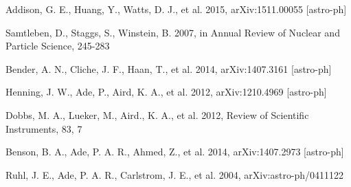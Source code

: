 \documentclass[preprint]{aastex}
\begin{document}
%
\begin{thebibliography}{dummy}
Addison, G. E., Huang, Y., Watts, D. J., et al. 2015, {arXiv:1511.00055 [astro-ph]}

Samtleben, D., Staggs, S., Winstein, B. 2007, in Annual Review of Nuclear and Particle Science, 245-283

Bender, A. N., Cliche, J. F., Haan, T., et al. 2014, {arXiv:1407.3161 [astro-ph]}

Henning, J. W., Ade, P., Aird, K. A., et al. 2012, {arXiv:1210.4969 [astro-ph]}

Dobbs, M. A., Lueker, M., Aird., K. A., et al. 2012, Review of Scientific Instruments, 83, 7

Benson, B. A., Ade, P. A. R., Ahmed, Z., et al. 2014, {arXiv:1407.2973 [astro-ph]}

Ruhl, J. E., Ade, P. A. R., Carlstrom, J. E., et al. 2004, {arXiv:astro-ph/0411122}

\end{thebibliography}
\end{document}
